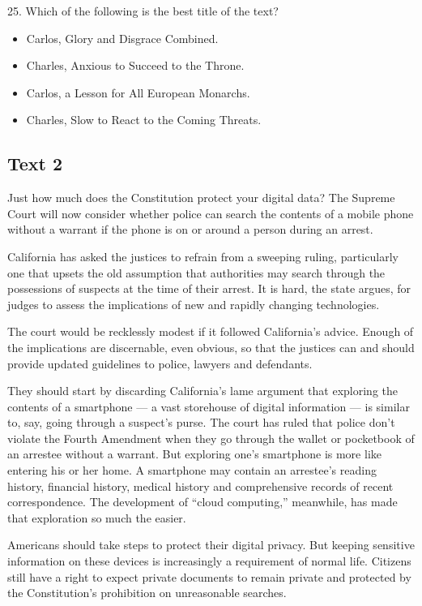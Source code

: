 \documentclass[UTF8,11pt]{ctexart}
\begin{document}
25. Which of the following is the best title of the text?


\begin{itemize}[leftmargin=2em,itemsep=.2em,topsep=.4em]\item[A.] Carlos, Glory and Disgrace Combined.
\item[B.] Charles, Anxious to Succeed to the Throne.
\item[C.] Carlos, a Lesson for All European Monarchs.
\item[D.] Charles, Slow to React to the Coming Threats.
\end{itemize}

\subsection*{\textbf{Text 2}}


Just how much does the Constitution protect your digital data? The Supreme Court will now consider whether police can search the contents of a mobile phone without a warrant if the phone is on or around a person during an arrest.


California has asked the justices to refrain from a sweeping ruling, particularly one that upsets the old assumption that authorities may search through the possessions of suspects at the time of their arrest. It is hard, the state argues, for judges to assess the implications of new and rapidly changing technologies.


The court would be recklessly modest if it followed California’s advice. Enough of the implications are discernable, even obvious, so that the justices can and should provide updated guidelines to police, lawyers and defendants.


They should start by discarding California’s lame argument that exploring the contents of a smartphone — a vast storehouse of digital information — is similar to, say, going through a suspect’s purse. The court has ruled that police don’t violate the Fourth Amendment when they go through the wallet or pocketbook of an arrestee without a warrant. But exploring one’s smartphone is more like entering his or her home. A smartphone may contain an arrestee’s reading history, financial history, medical history and comprehensive records of recent correspondence. The development of “cloud computing,” meanwhile, has made that exploration so much the easier.


Americans should take steps to protect their digital privacy. But keeping sensitive information on these devices is increasingly a requirement of normal life. Citizens still have a right to expect private documents to remain private and protected by the Constitution’s prohibition on unreasonable searches.
\end{document}
